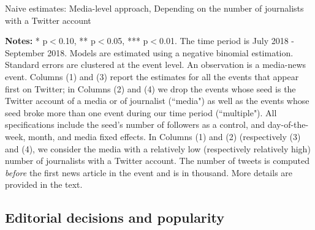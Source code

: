 \begin{table}
\caption{Naive estimates: Media-level approach, Depending on the number of journalists with a Twitter account}
\begin{center}
	
\end{center}
\begin{spacing}{0.5}
	{\fns \textbf{Notes:} * p$<$0.10, ** p$<$0.05, *** p$<$0.01. The time period is July 2018 - September 2018. Models are estimated using a negative binomial estimation. Standard errors are clustered at the event level. An observation is a media-news event.  Columns (1) and (3) report the estimates for all the events that appear first on Twitter; in Columns (2) and (4)  we drop the events whose seed is the Twitter account of a media or of journalist (``media") as well as the events whose seed broke more than one event during our time period (``multiple"). All specifications include the seed's number of followers as a control, and day-of-the-week, month, and media fixed effects. In Columns (1) and (2) (respectively (3) and (4), we consider the media with a relatively low (respectively relatively high) number of journalists with a Twitter account. The number of tweets is computed \textit{before} the first news article in the event and is in thousand. More details are provided in the text.} 
\end{spacing}
\label{Tab:number_articles_negbinomial_cevent_heterogeneity_nb_journalist_accounts}
\end{table} 



%
%



\subsection{Editorial decisions and popularity}

